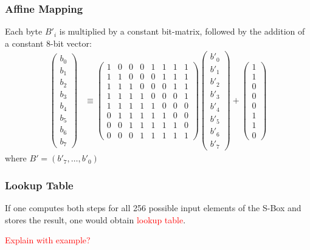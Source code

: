 \subsubsection{Affine Mapping}

Each byte ${B'}_i$ is multiplied by a constant bit-matrix, followed by the addition of a constant 8-bit vector:
\begin{align}
    \begin{pmatrix}
        b_0\\
        b_1\\
        b_2\\
        b_3\\
        b_4\\
        b_5\\
        b_6\\
        b_7
    \end{pmatrix}
    &\equiv
    \begin{pmatrix}
        1 & 0 & 0 & 0 & 1 & 1 & 1 & 1\\
        1 & 1 & 0 & 0 & 0 & 1 & 1 & 1\\
        1 & 1 & 1 & 0 & 0 & 0 & 1 & 1\\
        1 & 1 & 1 & 1 & 0 & 0 & 0 & 1\\
        1 & 1 & 1 & 1 & 1 & 0 & 0 & 0\\
        0 & 1 & 1 & 1 & 1 & 1 & 0 & 0\\
        0 & 0 & 1 & 1 & 1 & 1 & 1 & 0\\
        0 & 0 & 0 & 1 & 1 & 1 & 1 & 1
    \end{pmatrix}
    \begin{pmatrix}
        {b'}_0\\
        {b'}_1\\
        {b'}_2\\
        {b'}_3\\
        {b'}_4\\
        {b'}_5\\
        {b'}_6\\
        {b'}_7
    \end{pmatrix}
    +
    \begin{pmatrix}
        1\\
        1\\
        0\\
        0\\
        0\\
        1\\
        1\\
        0
    \end{pmatrix}
\end{align}
where ${B'} = \left( {b'}_7, \dots, {b'}_0 \right)$

\subsubsection{Lookup Table}

If one computes both steps for all 256 possible input elements of the S-Box and stores the result, one would obtain \textcolor{red}{lookup table}.

\textcolor{red}{Explain with example?}